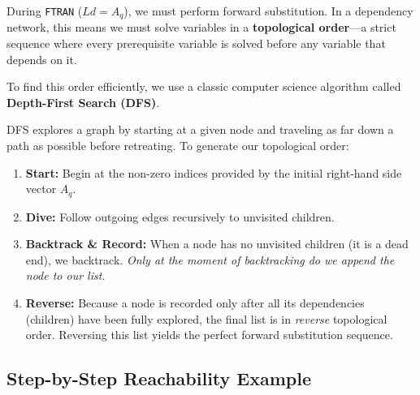 \documentclass[11pt, a4paper]{article}
\begin{document}
During \texttt{FTRAN} ($Ld = A_q$), we must perform forward substitution. In a dependency network, this means we must solve variables in a \textbf{topological order}---a strict sequence where every prerequisite variable is solved before any variable that depends on it.

To find this order efficiently, we use a classic computer science algorithm called \textbf{Depth-First Search (DFS)}. 

\begin{algostep}
DFS explores a graph by starting at a given node and traveling as far down a path as possible before retreating. To generate our topological order:
\begin{enumerate}[label=\textbf{\arabic*.}, leftmargin=*, itemsep=2pt]
    \item \textbf{Start:} Begin at the non-zero indices provided by the initial right-hand side vector $A_q$.
    \item \textbf{Dive:} Follow outgoing edges recursively to unvisited children.
    \item \textbf{Backtrack \& Record:} When a node has no unvisited children (it is a dead end), we backtrack. \emph{Only at the moment of backtracking do we append the node to our list.}
    \item \textbf{Reverse:} Because a node is recorded only after all its dependencies (children) have been fully explored, the final list is in \emph{reverse} topological order. Reversing this list yields the perfect forward substitution sequence.
\end{enumerate}
\end{algostep}

\subsection{Step-by-Step Reachability Example}
\end{document}
